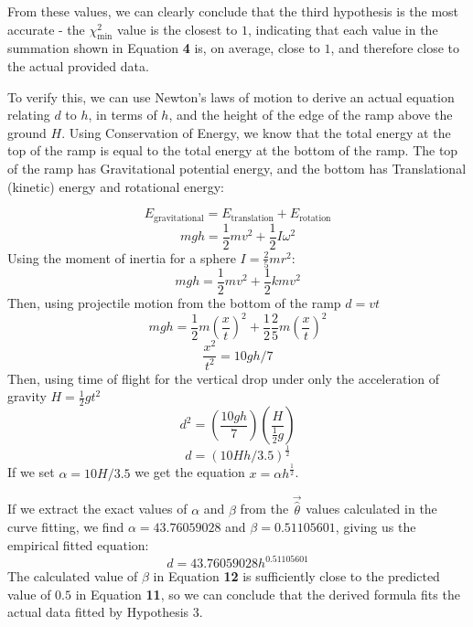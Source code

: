\documentclass[a4paper]{article}
\begin{document}
From these values, we can clearly conclude that the third hypothesis is the most accurate - the $\chi^2_\text{min}$ value is the closest to $1$, indicating that each value in the summation shown in Equation {\bf 4} is, on average, close to $1$, and therefore close to the actual provided data.

To verify this, we can use Newton's laws of motion to derive an actual equation relating $d$ to $h$, in terms of $h$, and the height of the edge of the ramp above the ground $H$. Using Conservation of Energy, we know that the total energy at the top of the ramp is equal to the total energy at the bottom of the ramp. The top of the ramp has Gravitational potential energy, and the bottom has Translational (kinetic) energy and rotational energy:

\begin{equation}
E_\text{gravitational}=E_\text{translation}+E_\text{rotation}
\end{equation}
\begin{equation}
mgh = \frac12mv^2 + \frac12I\omega^2
\end{equation}
Using the moment of inertia for a sphere $I=\frac25mr^2$:
\begin{equation}
mgh=\frac12mv^2+\frac12kmv^2
\end{equation}
Then, using projectile motion from the bottom of the ramp $d=vt$
\begin{equation}
mgh = \frac12m\left(\frac xt\right)^2 +\frac12 \frac25 m\left(\frac xt\right)^2
\end{equation}
\begin{equation}
\frac{x^2}{t^2}=10gh/7
\end{equation}
Then, using time of flight for the vertical drop under only the acceleration of gravity $H=\frac12gt^2$
\begin{equation}
d^2 = \left(\frac{10gh}{7}\right)\left(\frac H{\frac12g}\right)
\end{equation}
\begin{equation}
d=(10Hh/3.5)^\frac12
\end{equation}
If we set $\alpha=10H/3.5$ we get the equation $x=\alpha h^\frac12$. 

If we extract the exact values of $\alpha$ and $\beta$ from the $\vec{\hat\theta}$ values calculated in the curve fitting, we find $\alpha=43.76059028$ and $\beta=0.51105601$, giving us the empirical fitted equation:
\begin{equation}
d=43.76059028h^{0.51105601}
\end{equation}
The calculated value of $\beta$ in Equation {\bf 12} is sufficiently close to the predicted value of $0.5$ in Equation {\bf 11}, so we can conclude that the derived formula fits the actual data fitted by Hypothesis 3.
\end{document}
